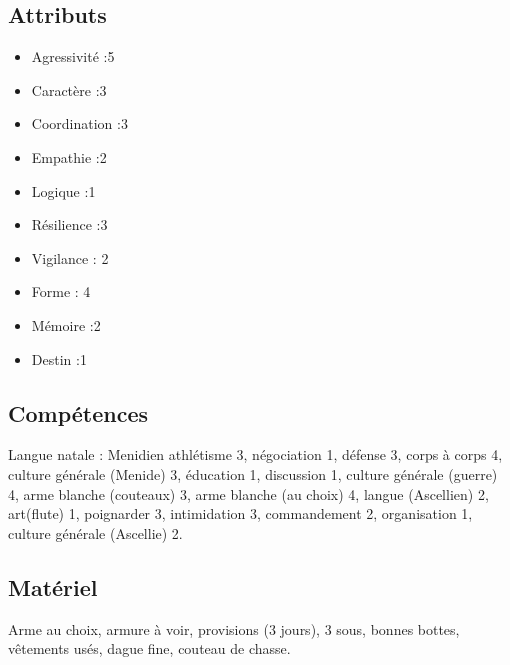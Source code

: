 \documentclass[10pt,a4paper]{article}
\begin{document}
\subsection{Attributs}
\begin{itemize}
\item Agressivité :5
\item Caractère :3
\item Coordination :3
\item Empathie :2
\item Logique :1
\item Résilience :3
\item Vigilance : 2
\item Forme : 4
\item Mémoire :2
\item Destin :1
\end{itemize}
\subsection{Compétences}
Langue natale : Menidien
athlétisme 3, négociation 1, défense 3, corps à corps 4, culture générale (Menide) 3, éducation 1, discussion 1, culture générale (guerre) 4, arme blanche (couteaux) 3, arme blanche (au choix) 4, langue (Ascellien) 2, art(flute) 1, poignarder 3, intimidation 3, commandement 2, organisation 1, culture générale (Ascellie) 2.
\subsection{Matériel}
Arme au choix, armure à voir, provisions (3 jours), 3 sous, bonnes bottes, vêtements usés, dague fine, couteau de chasse.
\end{document}
